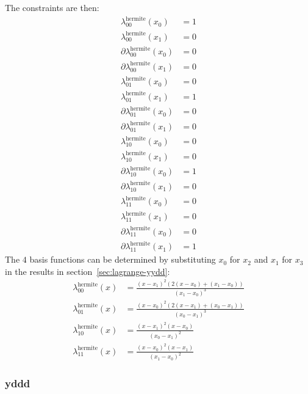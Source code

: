 The constraints are then:
\begin{align}
\lambda^{\text{hermite}}_{00}(x_0) & = 1 \\ 
\lambda^{\text{hermite}}_{00}(x_1) & = 0 \nonumber \\
\partial\lambda^{\text{hermite}}_{00}(x_0) & = 0 \nonumber \\
\partial\lambda^{\text{hermite}}_{00}(x_1) & = 0 \nonumber \\
\lambda^{\text{hermite}}_{01}(x_0) & = 0 \\ 
\lambda^{\text{hermite}}_{01}(x_1) & = 1 \nonumber \\
\partial\lambda^{\text{hermite}}_{01}(x_0) & = 0 \nonumber \\
\partial\lambda^{\text{hermite}}_{01}(x_1) & = 0 \nonumber \\
\lambda^{\text{hermite}}_{10}(x_0) & = 0 \\ 
\lambda^{\text{hermite}}_{10}(x_1) & = 0 \nonumber \\
\partial\lambda^{\text{hermite}}_{10}(x_0) & = 1 \nonumber \\
\partial\lambda^{\text{hermite}}_{10}(x_1) & = 0 \nonumber \\
\lambda^{\text{hermite}}_{11}(x_0) & = 0 \\ 
\lambda^{\text{hermite}}_{11}(x_1) & = 0 \nonumber \\
\partial\lambda^{\text{hermite}}_{11}(x_0) & = 0 \nonumber \\
\partial\lambda^{\text{hermite}}_{11}(x_1) & = 1 \nonumber 
\end{align}
The $4$ basis functions can be determined by substituting $x_0$
for $x_2$ and $x_1$ for $x_3$ in the results in 
section~\ref{sec:lagrange-yydd}:
\begin{align}
\lambda^{\text{hermite}}_{00}(x) & =
\frac
{(x-x_1)^2 \left(2(x - x_0) + (x_1 - x_0) \right)}
{(x_1-x_0)^3}
\\
\lambda^{\text{hermite}}_{01}(x) & =
\frac
{(x-x_0)^2 \left(2(x - x_1) + (x_0 - x_1) \right)}
{(x_0-x_1)^3}
\nonumber \\
\lambda^{\text{hermite}}_{10}(x) & =
\frac {(x-x_1)^2(x-x_0)} {(x_0-x_1)^2}
\nonumber \\
\lambda^{\text{hermite}}_{11}(x) & =
\frac {(x-x_0)^2(x-x_1)} {(x_1-x_0)^2}
\nonumber
\end{align}

\subsubsection{yddd}\label{sec:lagrange-yddd}

